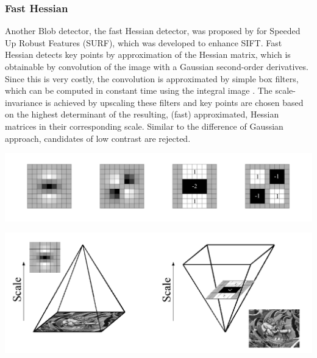 \documentclass[Bachelorarbeit.tex]{subfiles}
\begin{document}
	
\subsubsection{Fast Hessian}
Another Blob detector, the fast Hessian detector, was proposed by \cite{bay2006surf} for Speeded Up Robust Features (SURF), which was developed to enhance SIFT. Fast Hessian detects key points by approximation of the Hessian matrix, which is obtainable by convolution of the image with a Gaussian second-order derivatives. Since this is very costly, the convolution is approximated by simple box filters, which can be computed in constant time using the integral image \citep{viola2001rapid}. The scale-invariance is achieved by upscaling these filters and key points are chosen based on the highest determinant of the resulting, (fast) approximated, Hessian matrices in their corresponding scale. Similar to the difference of Gaussian approach, candidates of low contrast are rejected\citep{bay2006surf}.
\begin{center}
	\includegraphics[width=0.7\linewidth]{Images/fhess1}
\end{center}

\begin{center}
	\includegraphics[width=0.7\linewidth]{Images/fhess2}
\end{center}
\end{document}
